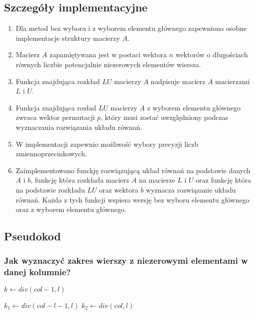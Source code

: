 \documentclass{article}
\begin{document}
\subsection{Szczegóły implementacyjne}
\begin{enumerate}
    \item Dla metod bez wyboru i z wyborem elementu głównego zapewniono osobne implementacje struktury macierzy $A$.
    \item Macierz $A$ zapamiętywana jest w postaci wektora $n$ wektorów o długościach równych liczbie potencjalnie niezerowych elementów wiersza.
    \item Funkcja znajdująca rozkład $LU$ macierzy $A$ nadpisuje macierz $A$ macierzami $L$ i $U$.
    \item Funkcja znajdująca rozład $LU$ macierzy $A$ z wyborem elementu głównego zwraca wektor permutacji $p$, który musi zostać uwzględniony podczas wyznaczania rozwiązania układu równań.
    \item W implementacji zapewnio możliwość wybory precyzji liczb zmiennoprzecinkowych.
    \item Zaimplementowano funckję rozwiązującą układ równań na podstawie danych $A$ i $b$, funkcję która rozkłada macierz $A$ na macierze $L$ i $U$ oraz funkcję która na podstawie rozkładu $LU$ oraz wektora $b$ wyznacza rozwiązanie układu równań.
        Każda z tych funkcji wspiera wersję bez wyboru elementu głównego oraz z wyborem elementu głównego.
\end{enumerate}

\subsection{Pseudokod}
\subsubsection{Jak wyznaczyć zakres wierszy z niezerowymi elementami w danej kolumnie?}
\begin{algorithm}[H]
    $k \leftarrow div(col-1,l)$\;
    \;
\end{algorithm}

\begin{algorithm}
    $k_1 \leftarrow div(col - l - 1, l)$\;
    $k_2 \leftarrow div(col,l)$\;
    \;
\end{algorithm}
    
\end{document}
